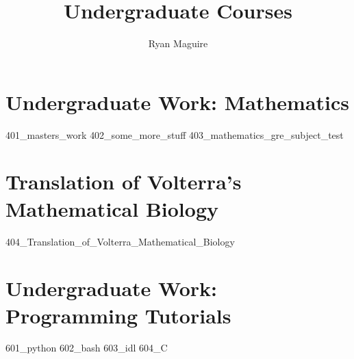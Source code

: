 \documentclass[crop=false,class=book,oneside]{standalone}
\title{Undergraduate Courses}
\author{Ryan Maguire}
\date{\vspace{-5ex}}
\begin{document}
\part{Undergraduate Work: Mathematics}
{401_masters_work}
{402_some_more_stuff}
{403_mathematics_gre_subject_test}
\part{Translation of Volterra's Mathematical Biology}
{404_Translation_of_Volterra_Mathematical_Biology}
\part{Undergraduate Work: Programming Tutorials}
{601_python}
{602_bash}
{603_idl}
{604_C}
\end{document}
